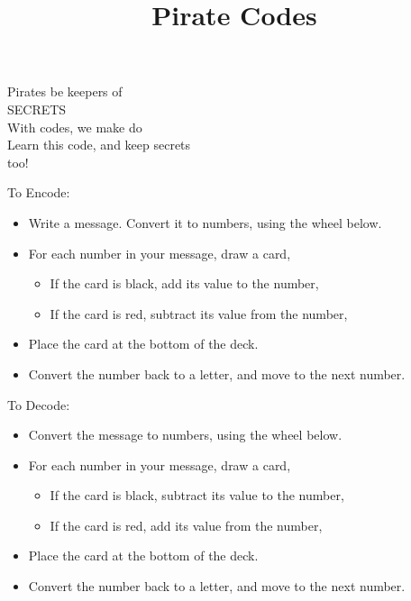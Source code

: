 \documentclass{../exhibit}
\title{Pirate Codes}
\begin{document}
\begin{context}

  Pirates be keepers of\\
  \hspace{1in}SECRETS \\
  With codes, we make do\\[1cm]

  Learn this code, and keep secrets\\
  \hspace{2in}too!
  
\end{context}

\begin{directions}\Large
  To Encode:
  \begin{itemize}
    \item Write a message. Convert it to numbers, using the wheel below.
    \item For each number in your message, draw a card,
      \begin{itemize}
      \item If the card is black, add its value
        to the number,
      \item If the card is red, subtract its value from the number,
      \end{itemize}
    \item Place the card at the bottom of the deck.
    \item Convert the number back to a letter, and move to the next number.
  \end{itemize}
      To Decode:
  \begin{itemize}
    \item Convert the message to numbers, using the wheel below.
    \item For each number in your message, draw a card,
      \begin{itemize}
      \item If the card is black, subtract its value
        to the number,
      \item If the card is red, add its value from the number,
      \end{itemize}
      \item Place the card at the bottom of the deck.
      \item Convert the number back to a letter, and move to the next number.
  \end{itemize}
\end{directions}
\end{document}
